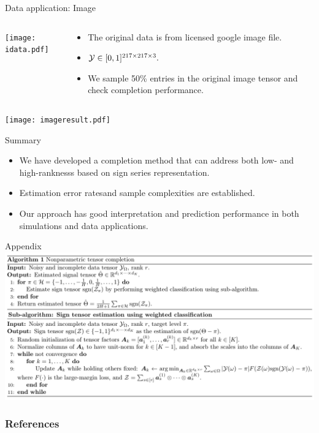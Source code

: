 \documentclass[10pt, mathserif]{beamer} %
\theoremstyle{definition}
\theoremstyle{plain}
\begin{document}
\begin{frame}{Data application: Image}
 \begin{columns}
\begin{column}{0.20\textwidth}
   \begin{center}
     \texttt{[image: idata.pdf]}
     \end{center}
\end{column}
\begin{column}{0.7\textwidth} 
\begin{itemize}
    \item The original data is from licensed google image file.
    \item  $\mathcal{Y}\in[0,1]^{217\times217\times3}.$ 
    \item We sample 50\% entries in the original image tensor and check completion performance.
\end{itemize}
\end{column}
\end{columns}


      \begin{center}
    \texttt{[image: imageresult.pdf]}
    \end{center}
\end{frame}

\begin{frame}{Summary}
\begin{itemize}
    \item We have developed a completion method that can address {\color{red} both low- and high-ranknesss}  based on {\color{red}sign series representation}.
    \item {\color{red}Estimation error rates}and {\color{red}sample complexities} are established.
    \item Our approach has good interpretation and prediction performance in both simulations and data applications.
    
\end{itemize}
    
\end{frame}



\appendix
\begin{frame}{Appendix}
    \includegraphics[width = \textwidth]{algorithm.pdf}
\end{frame}

\begin{frame}[allowframebreaks]
        \frametitle{References}
 

\end{frame}
\end{document}
